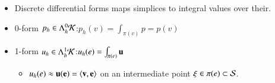 \documentclass[15pt,t,aspectratio=1610]{beamer}
\begin{document}
  \begin{frame}
    \begin{itemize}
      \item<1-> Discrete differential forms maps simplices to integral values over their.
      \item<2-> 0-form \( p_{h}\in\Lambda^{0}_{h}\mathcal{K} \):\quad \( p_{h}(v) = \int_{\pi(v)}p = p(v) \)
      \item<3-> 1-form \( u_{h}\in\Lambda^{1}_{h}\mathcal{K} \):\quad \( u_{h}(e) = \int_{\pi(e)}\mathbf{u}\)
             \begin{itemize}
              \item<4-> \( u_{h}(e) \approx \mathbf{u}(\mathbf{e}) = \left\langle \mathbf{v}, \mathbf{e} \right\rangle \) on an intermediate point \(\xi\in\pi(e)\subset\mathcal{S}  \).
             \end{itemize}
    \end{itemize}
  \end{frame}
\end{document}
